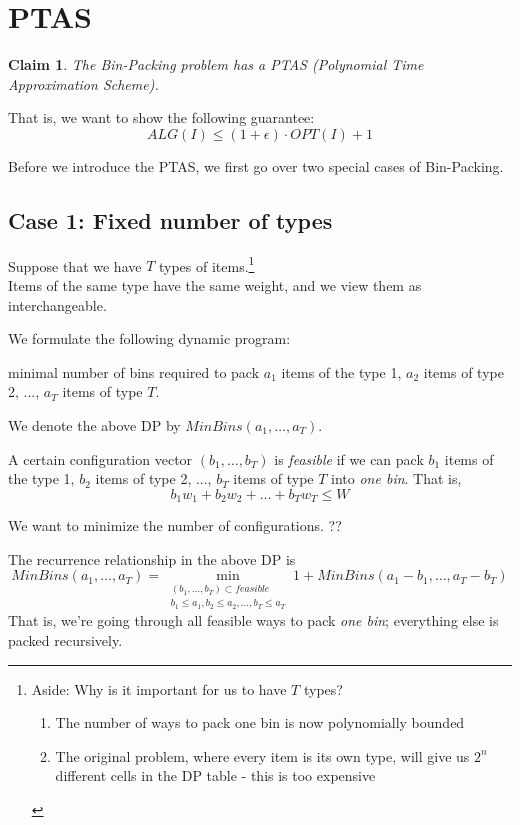 \documentclass{article}
\newtheorem{claim}[theorem]{Claim}
\begin{document}
\section{PTAS}

\begin{claim}
The Bin-Packing problem has a PTAS (Polynomial Time Approximation Scheme). 
\end{claim}
That is, we want to show the following guarantee: 
\[
	ALG(I) \leq (1+\epsilon)\cdot OPT(I) + 1
\]

Before we introduce the PTAS, we first go over two special cases of Bin-Packing. 

\subsection{Case 1: Fixed number of types}

Suppose that we have $T$ types of items.\footnote{
	Aside: Why is it important for us to have $T$ types?  

	\begin{enumerate}
		\item The number of ways to pack one bin is now polynomially bounded 
		\item The original problem, where every item is its own type, will give us $2^n$ different cells in the DP table - this is too expensive
	\end{enumerate}
} \\
Items of the same type have the same weight, and we view them as interchangeable. 

We formulate the following dynamic program: 

minimal number of bins required to pack $a_1$ items of the type 1, $a_2$ items of type 2, ..., $a_T$ items of type $T$. 

We denote the above DP by $MinBins(a_1, \ldots, a_T)$. 

A certain configuration vector $(b_1, \ldots, b_T)$ is \textit{feasible} if we can pack $b_1$ items of the type 1, $b_2$ items of type 2, ..., $b_T$ items of type $T$ into \textit{one bin}. That is, 
\[
	b_1 w_1 + b_2 w_2 + \ldots + b_T w_T \leq W
\]

We want to minimize the number of configurations. ?? 

The recurrence relationship in the above DP is 
\[
	MinBins(a_1, \ldots, a_T) = \min_{\substack{(b_1, \ldots, b_T) \subset feasible\\b_1 \leq a_1, b_2 \leq a_2, \ldots, b_T \leq a_T}} 1 + MinBins(a_1 - b_1, \ldots, a_T - b_T)
\]
That is, we're going through all feasible ways to pack \textit{one bin}; everything else is packed recursively. 
\end{document}
